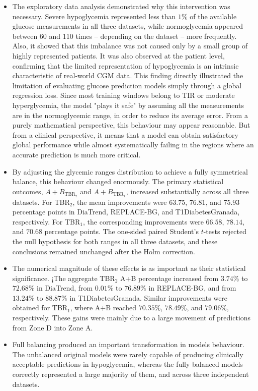 \begin{itemize}
    \item  The exploratory data analysis demonstrated why this intervention was necessary. Severe hypoglycemia represented less than \(1\%\) of the available glucose measurements in all three datasets, while normoglycemia appeared between 60 and 110 times -- depending on the dataset -- more frequently. Also, it showed that this imbalance was not caused only by a small group of highly represented patients. It was also observed at the patient level, confirming that the limited representation of hypoglycemia is an intrinsic characteristic of real-world CGM data. This finding directly illustrated the limitation of evaluating glucose prediction models simply through a global regression loss. Since most training windows belong to TIR or moderate hyperglycemia, the model "plays it safe" by assuming all the measurements are in the normoglycemic range, in order to reduce its average error. From a purely mathematical perspective, this behaviour may appear reasonable. But from a clinical perspective, it means that a model can obtain satisfactory global performance while almost systematically failing in the regions where an accurate prediction is much more critical.
    \item By adjusting the glycemic ranges distribution to achieve a fully symmetrical balance, this behaviour changed enormously. The primary statistical outcomes, \(A+B_{\mathrm{TBR_2}}\) and \(A+B_{\mathrm{TBR_1}}\), increased substantially across all three datasets. For TBR$_2$, the mean improvements were \(63.75\), \(76.81\), and \(75.93\) percentage points in DiaTrend, REPLACE-BG, and T1DiabetesGranada, respectively. For TBR$_1$, the corresponding improvements were \(66.58\), \(78.14\), and \(70.68\) percentage points. The one-sided paired Student's \(t\)-tests rejected the null hypothesis for both ranges in all three datasets, and these conclusions remained unchanged after the Holm correction.
    \item The numerical magnitude of these effects is as important as their statistical significance. ¡The aggregate TBR$_2$ A+B percentage increased from \(3.74\%\) to \(72.68\%\) in DiaTrend, from \(0.01\%\) to \(76.89\%\) in REPLACE-BG, and from \(13.24\%\) to \(88.87\%\) in T1DiabetesGranada. Similar improvements were obtained for TBR$_1$, where A+B reached \(70.35\%\), \(78.49\%\), and \(79.06\%\), respectively. These gains were mainly due to a large movement of predictions from Zone D into Zone A.
    \item Full balancing produced an important transformation in models behaviour. The unbalanced original models were rarely capable of producing clinically acceptable predictions in hypoglycemia, whereas the fully balanced models correctly represented a large majority of them, and across three independent datasets.

\end{itemize}
